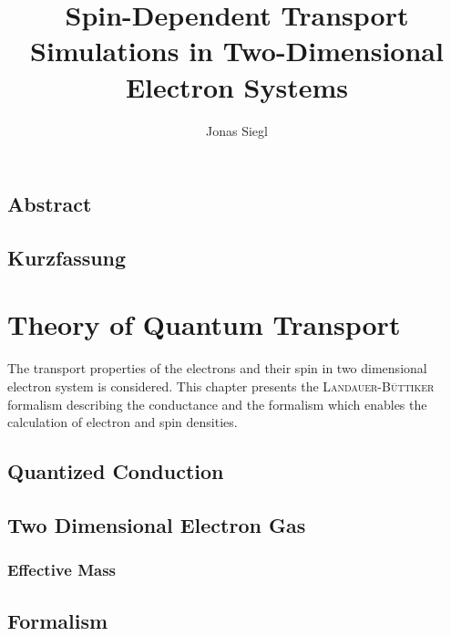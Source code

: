 
\author{Jonas Siegl}
\title{Spin-Dependent Transport Simulations in Two-Dimensional Electron Systems}






\pagestyle{plain} %
\tableofcontents
\clearpage
\section*{Abstract}

\clearpage
\section*{Kurzfassung}

\clearpage
\pagestyle{main}
\chapter{Theory of Quantum Transport}
The transport properties of the electrons and their spin in two dimensional electron system is considered. This chapter presents the \textsc{Landauer-B\"uttiker} formalism describing the conductance and the \gfnc{} formalism which enables the calculation of electron and spin densities.
\section{Quantized Conduction}
  
  \section{Two Dimensional Electron Gas}
    
      \subsection{Effective Mass \hamil{}}
	
	
  \section{\cgfnc{} Formalism}
  
